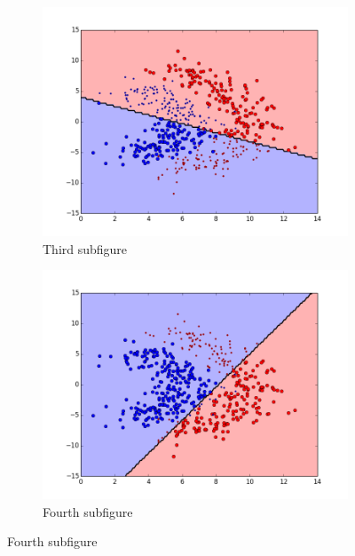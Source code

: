 \begin{figure}[t!]
\medskip
\begin{subfigure}{0.48\textwidth}
\includegraphics[width=\linewidth]{figs/Lithuanian/44All-Classifiers}
\caption{Third subfigure} \label{fig:Lithuanian_all_single_c}
\end{subfigure}\hspace*{\fill}
\begin{subfigure}{0.48\textwidth}
\includegraphics[width=\linewidth]{figs/Lithuanian/65All-Classifiers}
\caption{Fourth subfigure} \label{fig:Lithuanian_all_single_d}
\end{subfigure}


\end{figure}
